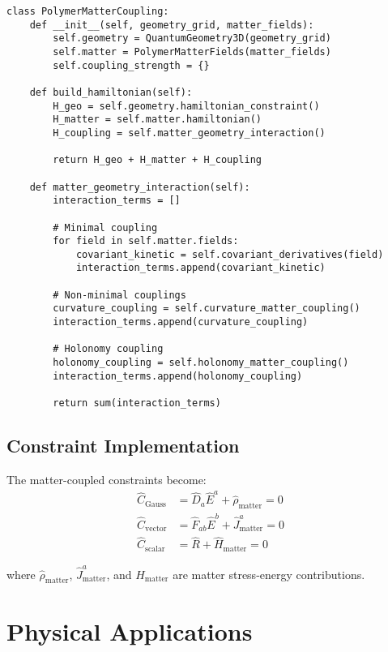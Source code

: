 \documentclass[11pt]{article}
\begin{document}
\begin{verbatim}
class PolymerMatterCoupling:
    def __init__(self, geometry_grid, matter_fields):
        self.geometry = QuantumGeometry3D(geometry_grid)
        self.matter = PolymerMatterFields(matter_fields)
        self.coupling_strength = {}
        
    def build_hamiltonian(self):
        H_geo = self.geometry.hamiltonian_constraint()
        H_matter = self.matter.hamiltonian()
        H_coupling = self.matter_geometry_interaction()
        
        return H_geo + H_matter + H_coupling
        
    def matter_geometry_interaction(self):
        interaction_terms = []
        
        # Minimal coupling
        for field in self.matter.fields:
            covariant_kinetic = self.covariant_derivatives(field)
            interaction_terms.append(covariant_kinetic)
            
        # Non-minimal couplings
        curvature_coupling = self.curvature_matter_coupling()
        interaction_terms.append(curvature_coupling)
        
        # Holonomy coupling
        holonomy_coupling = self.holonomy_matter_coupling()
        interaction_terms.append(holonomy_coupling)
        
        return sum(interaction_terms)
\end{verbatim}

\subsection{Constraint Implementation}

The matter-coupled constraints become:
\begin{align}
\hat{C}_{\text{Gauss}} &= \hat{D}_a \hat{E}^a + \hat{\rho}_{\text{matter}} = 0 \\
\hat{C}_{\text{vector}} &= \hat{F}_{ab} \hat{E}^b + \hat{J}_{\text{matter}}^a = 0 \\
\hat{C}_{\text{scalar}} &= \hat{R} + \hat{H}_{\text{matter}} = 0
\end{align}

where $\hat{\rho}_{\text{matter}}$, $\hat{J}_{\text{matter}}^a$, and $\hat{H}_{\text{matter}}$ are matter stress-energy contributions.

\section{Physical Applications}
\end{document}
